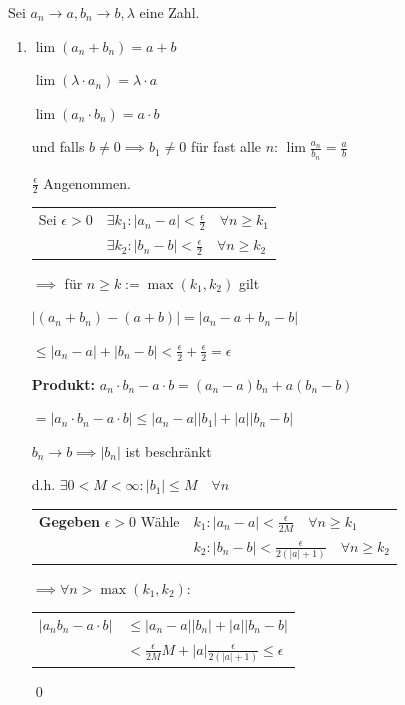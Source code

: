 \documentclass[fleqn]{scrbook}
\renewenvironment{proof}{{\bfseries Beweis }}{\qed}
\begin{document}
Sei $a_n\to a, b_n \to b, \lambda $ eine Zahl.

\begin{enumerate}
  \item $\lim(a_n+b_n)=a+b$
  
    $\lim(\lambda \cdot a_n)=\lambda \cdot a$
    
    $\lim(a_n \cdot b_n)=a \cdot b$
    
    und falls $b \neq 0 \implies b_1 \neq 0$ für fast alle $n$: $\lim \frac{a_n}{b_n} = \frac{a}{b}$ 
 
  \begin{proof}
    
    $\frac{\epsilon}{2}$ Angenommen.
    
    \begin{tabular}{rl}
      Sei $\epsilon > 0$ & $\exists k_1:|a_n-a|<\frac{\epsilon}{2} \quad \forall n \geq k_1$ \\
    
                         & $\exists k_2:|b_n-b|<\frac{\epsilon}{2} \quad \forall n \geq k_2$
    \end{tabular}

    $\implies$ für $n\geq k := \max(k_1,k_2)$ gilt

    $|(a_n+b_n)-(a+b)|=|a_n-a+b_n-b|$
  
    $\leq |a_n-a| + |b_n-b| < \frac{\epsilon}{2}+\frac{\epsilon}{2}= \epsilon$
  
    \textbf{Produkt:} $a_n \cdot b_n-a \cdot b=(a_n-a)b_n+a(b_n-b)$
  
    $=|a_n \cdot b_n -a \cdot b| \leq |a_n-a||b_1|+|a||b_n-b|$
    
    $b_n \to b \implies |b_n|$ ist beschränkt 
    
    d.h. $\exists 0 < M < \infty: |b_1| \leq M \quad \forall n$
    
    \begin{tabular}{rl}
      \textbf{Gegeben} $\epsilon > 0$ Wähle & $k_1: |a_n-a|<\frac{\epsilon}{2M} \quad \forall n \geq k_1$ \\
                                            & $k_2: |b_n-b|<\frac{\epsilon}{2(|a|+1)} \quad \forall n \geq k_2$
    \end{tabular}

	$\implies \forall n > \max(k_1,k_2):$


    \begin{tabular}{rl}
      $|a_nb_n-a \cdot b|$ & $\leq |a_n-a||b_n|+|a||b_n-b|$ \\
                     & $< \frac{\epsilon}{2M}M+|a|\frac{\epsilon}{2(|a|+1)} \leq \epsilon$
    \end{tabular}
    

\end{proof}
\end{enumerate}
\end{document}
